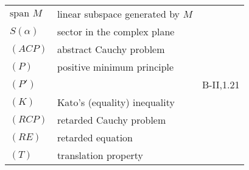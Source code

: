 \begin{longtable}{p{}p{}p{}}
$\text{span } M$ & linear subspace generated by $M$ & \\
$S(\alpha)$ & sector in the complex plane & \\
$(ACP)$ & abstract Cauchy problem & \\
$(P)$ & positive minimum principle & \\
$(P')$ & & B-II,1.21 \\
$(K)$ & Kato's (equality) inequality & \\
$(RCP)$ & retarded Cauchy problem & \\
$(RE)$ & retarded equation & \\
$(T)$ & translation property & \\

\end{longtable}

%
